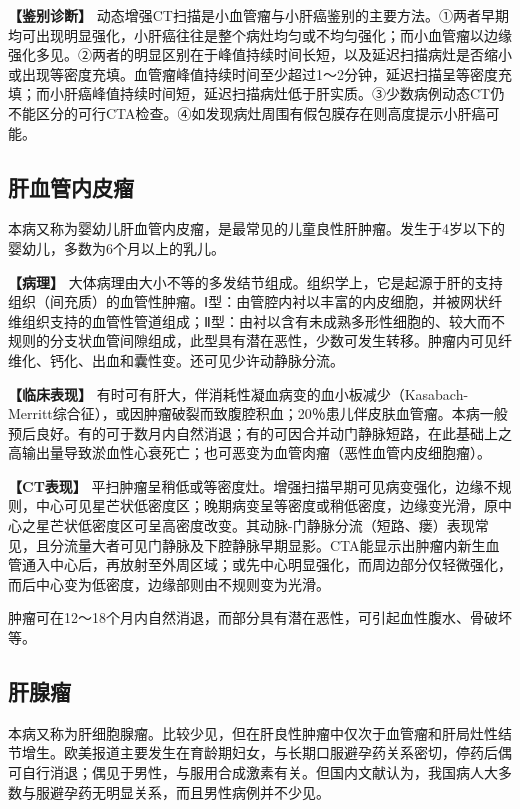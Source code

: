 \textbf{【鉴别诊断】}
动态增强CT扫描是小血管瘤与小肝癌鉴别的主要方法。①两者早期均可出现明显强化，小肝癌往往是整个病灶均匀或不均匀强化；而小血管瘤以边缘强化多见。②两者的明显区别在于峰值持续时间长短，以及延迟扫描病灶是否缩小或出现等密度充填。血管瘤峰值持续时间至少超过1～2分钟，延迟扫描呈等密度充填；而小肝癌峰值持续时间短，延迟扫描病灶低于肝实质。③少数病例动态CT仍不能区分的可行CTA检查。④如发现病灶周围有假包膜存在则高度提示小肝癌可能。

\subsection{肝血管内皮瘤}

本病又称为婴幼儿肝血管内皮瘤，是最常见的儿童良性肝肿瘤。发生于4岁以下的婴幼儿，多数为6个月以上的乳儿。

\textbf{【病理】}
大体病理由大小不等的多发结节组成。组织学上，它是起源于肝的支持组织（间充质）的血管性肿瘤。Ⅰ型：由管腔内衬以丰富的内皮细胞，并被网状纤维组织支持的血管性管道组成；Ⅱ型：由衬以含有未成熟多形性细胞的、较大而不规则的分支状血管间隙组成，此型具有潜在恶性，少数可发生转移。肿瘤内可见纤维化、钙化、出血和囊性变。还可见少许动静脉分流。

\textbf{【临床表现】}
有时可有肝大，伴消耗性凝血病变的血小板减少（Kasabach-Merritt综合征），或因肿瘤破裂而致腹腔积血；20％患儿伴皮肤血管瘤。本病一般预后良好。有的可于数月内自然消退；有的可因合并动门静脉短路，在此基础上之高输出量导致淤血性心衰死亡；也可恶变为血管肉瘤（恶性血管内皮细胞瘤）。

\textbf{【CT表现】}
平扫肿瘤呈稍低或等密度灶。增强扫描早期可见病变强化，边缘不规则，中心可见星芒状低密度区；晚期病变呈等密度或稍低密度，边缘变光滑，原中心之星芒状低密度区可呈高密度改变。其动脉-门静脉分流（短路、瘘）表现常见，且分流量大者可见门静脉及下腔静脉早期显影。CTA能显示出肿瘤内新生血管通入中心后，再放射至外周区域；或先中心明显强化，而周边部分仅轻微强化，而后中心变为低密度，边缘部则由不规则变为光滑。

肿瘤可在12～18个月内自然消退，而部分具有潜在恶性，可引起血性腹水、骨破坏等。

\subsection{肝腺瘤}

本病又称为肝细胞腺瘤。比较少见，但在肝良性肿瘤中仅次于血管瘤和肝局灶性结节增生。欧美报道主要发生在育龄期妇女，与长期口服避孕药关系密切，停药后偶可自行消退；偶见于男性，与服用合成激素有关。但国内文献认为，我国病人大多数与服避孕药无明显关系，而且男性病例并不少见。

